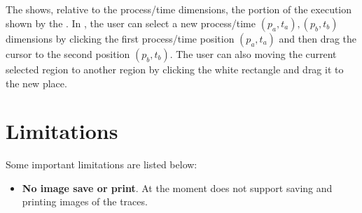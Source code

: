 \subsection{\miniview}
\label{sec:miniview}

The \miniview{} shows, relative to the process/time dimensions, the portion of the execution shown by the \traceview.
In \miniview{}, the user can select a new process/time $(p_a,t_a),(p_b,t_b)$ dimensions by clicking the first process/time position $(p_a,t_a)$ and then drag the cursor to the second position $(p_b,t_b)$.
The user can also moving the current selected region to another region by clicking the white rectangle and drag it to the new place.





\section{Limitations}

Some important \hpctraceviewer{} limitations are listed below:
\begin{itemize}

\item \textbf{No image save or print}.
	At the moment \hpctraceviewer{} does not support saving and printing images of the traces.


\end{itemize}
